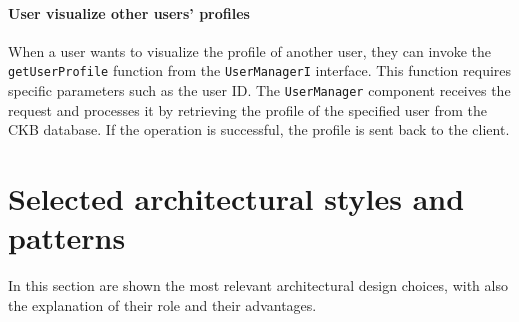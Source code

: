 \paragraph{User visualize other users' profiles}
When a user wants to visualize the profile of another user, they can invoke the \verb|getUserProfile| function from the \verb|UserManagerI| interface. This function requires specific parameters such as the user ID.
The \verb|UserManager| component receives the request and processes it by retrieving the profile of the specified user from the CKB database. If the operation is successful, the profile is sent back to the client.

\newpage

\section{Selected architectural styles and patterns}

In this section are shown the most relevant architectural design choices, with also the explanation of their role and their advantages.

